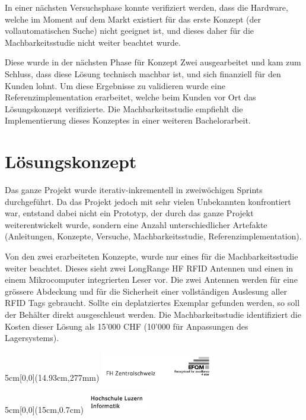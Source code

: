 \documentclass[
	a4paper
]{scrartcl}
\begin{document}
In einer nächsten Versuchsphase konnte verifiziert werden, dass die Hardware, welche im Moment auf dem Markt existiert für das erste Konzept (der vollautomatischen Suche) nicht geeignet ist, und dieses daher für die Machbarkeitsstudie nicht weiter beachtet wurde.

Diese wurde in der nächsten Phase für Konzept Zwei ausgearbeitet und kam zum Schluss, dass diese Lösung technisch machbar ist, und sich finanziell für den Kunden lohnt. Um diese Ergebnisse zu validieren wurde eine Referenzimplementation erarbeitet, welche beim Kunden vor Ort das Lösungskonzept verifizierte. Die Machbarkeitsstudie empfiehlt die Implementierung dieses Konzeptes in einer weiteren Bachelorarbeit.

\section{Lösungskonzept}
Das ganze Projekt wurde iterativ-inkrementell in zweiwöchigen Sprints durchgeführt. Da das Projekt jedoch mit sehr vielen Unbekannten konfrontiert war, entstand dabei nicht ein Prototyp, der durch das ganze Projekt weiterentwickelt wurde, sondern eine Anzahl unterschiedlicher Artefakte (Anleitungen, Konzepte, Versuche, Machbarkeitsstudie, Referenzimplementation).

Von den zwei erarbeiteten Konzepte, wurde nur eines für die Machbarkeitsstudie weiter beachtet. Dieses sieht zwei LongRange HF RFID Antennen und einen in einem Mikrocomputer integrierten Leser vor. Die zwei Antennen werden für eine grössere Abdeckung und für die Sicherheit einer vollständigen Auslesung aller RFID Tags gebraucht. Sollte ein deplatziertes Exemplar gefunden werden, so soll der Behälter direkt ausgeschleust werden. Die Machbarkeitsstudie identifiziert die Kosten dieser Lösung als 15'000 CHF (10'000 für Anpassungen des Lagersystems).

\begin{textblock*}{5cm}[0,0](14.93cm,277mm)
	\includegraphics[keepaspectratio,width=5cm]{img/FHZ_Logo}
\end{textblock*}

\newpage

\begin{textblock*}{5cm}[0,0](15cm,0.7cm)
	\includegraphics[keepaspectratio,width=2.7cm]{img/HSLU_Logo_Header}
\end{textblock*}
\end{document}
